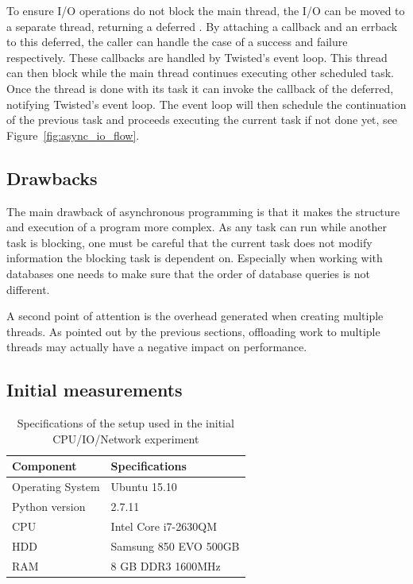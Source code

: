 To ensure I/O operations do not block the main thread, the I/O can be moved to a separate thread, returning a deferred .
By attaching a callback and an errback to this deferred, the caller can handle the case of a success and failure respectively.
These callbacks are handled by Twisted's event loop.
This thread can then block while the main thread continues executing other scheduled task.
Once the thread is done with its task it can invoke the callback of the deferred, notifying Twisted's event loop.
The event loop will then schedule the continuation of the previous task and proceeds executing the current task if not done yet, see Figure~\ref{fig:async_io_flow}.

\subsection{Drawbacks}

The main drawback of asynchronous programming is that it makes the structure and execution of a program more complex.
As any task can run while another task is blocking, one must be careful that the current task does not modify information the blocking task is dependent on.
Especially when working with databases one needs to make sure that the order of database queries is not different.

A second point of attention is the overhead generated when creating multiple threads.
As pointed out by the previous sections, offloading work to multiple threads may actually have a negative impact on performance.

\subsection{Initial measurements}

\begin{table}[h]
	\centering
	\caption{Specifications of the setup used in the initial CPU/IO/Network experiment}
	\label{table:setup_initial_experiment}
	\begin{tabular}{l|l}
		\textbf{Component} 	& \textbf{Specifications} \\ \hline
		Operating System   	& Ubuntu 15.10 \\
		Python version		& 2.7.11 \\
		CPU					& Intel Core i7-2630QM \\ 
		HDD					& Samsung 850 EVO 500GB  \\ 
		RAM					& 8 GB DDR3 1600MHz \\
	\end{tabular}
\end{table}


